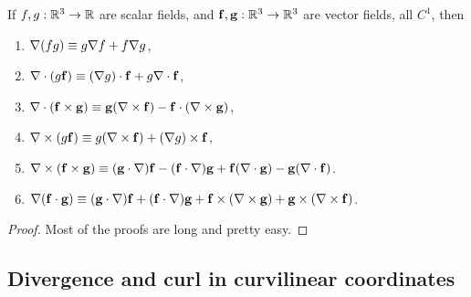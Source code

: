 \documentclass[10pt, a4paper]{article}
\begin{document}
\begin{proposition}
    If $f, g : \mathbb{R} ^ 3 \to \mathbb{R}$ are scalar fields,
    and $\mathbf{f, g} : \mathbb{R} ^ 3 \to \mathbb{R} ^ 3$ are vector fields,
    all $C ^ {1}$,
    then
    \begin{enumerate}[label = (\roman*)]
        \item $\mathbf{\nabla}(fg) \equiv g\mathbf{\nabla}f + f\mathbf{\nabla}g$,

        \item $\mathbf{\nabla} \cdot (g\mathbf{f}) \equiv (\mathbf{\nabla} g) \cdot \mathbf{f} + g\mathbf{\nabla} \cdot \mathbf{f}$,

        \item $\mathbf{\nabla} \cdot (\mathbf{f} \times \mathbf{g}) \equiv \mathbf{g}(\mathbf{\nabla} \times \mathbf{f}) - \mathbf{f} \cdot (\mathbf{\nabla} \times \mathbf{g})$,

        \item $\mathbf{\nabla} \times (g\mathbf{f}) \equiv g(\mathbf{\nabla} \times \mathbf{f}) + (\mathbf{\nabla} g) \times \mathbf{f}$,

        \item $\mathbf{\nabla} \times (\mathbf{f} \times \mathbf{g}) \equiv (\mathbf{g} \cdot \mathbf{\nabla})\mathbf{f} - (\mathbf{f} \cdot \mathbf{\nabla})\mathbf{g} + \mathbf{f}(\mathbf{\nabla} \cdot \mathbf{g}) - \mathbf{g}(\mathbf{\nabla} \cdot \mathbf{f})$.

        \item $\mathbf{\nabla}(\mathbf{f} \cdot \mathbf{g}) \equiv (\mathbf{g} \cdot \mathbf{\nabla}) \mathbf{f} + (\mathbf{f} \cdot \mathbf{\nabla})\mathbf{g} + \mathbf{f} \times (\mathbf{\nabla} \times \mathbf{g}) + \mathbf{g} \times (\mathbf{\nabla} \times \mathbf{f})$.
    \end{enumerate}

    \begin{proof}
        Most of the proofs are long and pretty easy.
    \end{proof}
\end{proposition}

\subsection{Divergence and curl in curvilinear coordinates}
\end{document}
